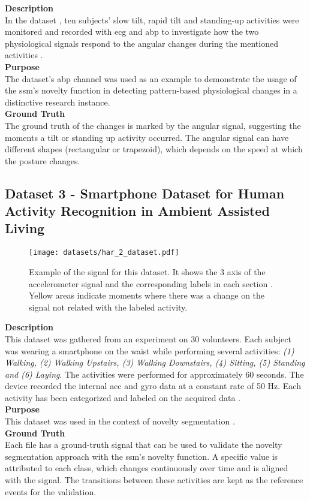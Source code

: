 \textbf{Description}\hfill\\
In the dataset \cite{tilt}, ten subjects' slow tilt, rapid tilt and standing-up activities were monitored and recorded with \gls{ecg} and \gls{abp} to investigate how the two physiological signals respond to the angular changes during the mentioned activities \cite{tilt, PhysioNet}.\\
\textbf{Purpose}\hfill\\
The dataset's \gls{abp} channel was used as an example to demonstrate the usage of the \gls{ssm}'s novelty function in detecting pattern-based physiological changes in a distinctive research instance.\\
\textbf{Ground Truth}\hfill\\
The ground truth of the changes is marked by the angular signal, suggesting the moments a tilt or standing up activity occurred. The angular signal can have different shapes (rectangular or trapezoid), which depends on the speed at which the posture changes.
 
\subsection{Dataset 3 - Smartphone Dataset for Human Activity Recognition in Ambient Assisted Living}
\label{dat:dataset3}

\begin{figure}
\centering
\texttt{[image: datasets/har\_2\_dataset.pdf]}
\caption{Example of the signal for this dataset. It shows the 3 axis of the accelerometer signal and the corresponding labels in each section \cite{dataset2, dataset2_2}. Yellow areas indicate moments where there was a change on the signal not related with the labeled activity.}
\label{fig:har2_dataset}
\end{figure}

\textbf{Description}\hfill\\
This dataset was gathered from an experiment on 30 volunteers. Each subject was wearing a smartphone on the waist while performing several activities: \textit{(1) Walking, (2) Walking Upstairs, (3) Walking Downstairs, (4) Sitting, (5) Standing and (6) Laying}. The activities were performed for approximately 60 seconds. The device recorded the internal \gls{acc} and \gls{gyro} data at a constant rate of 50 Hz. Each activity has been categorized and labeled on the acquired data \cite{dataset2, dataset2_2}.\\
\textbf{Purpose}\hfill\\
This dataset was used in the context of novelty segmentation \cite{dataset2, dataset2_2}.\\
\textbf{Ground Truth}\hfill\\
Each file has a ground-truth signal that can be used to validate the novelty segmentation approach with the \gls{ssm}'s novelty function. A specific value is attributed to each class, which changes continuously over time and is aligned with the signal. The transitions between these activities are kept as the reference events for the validation.
    
